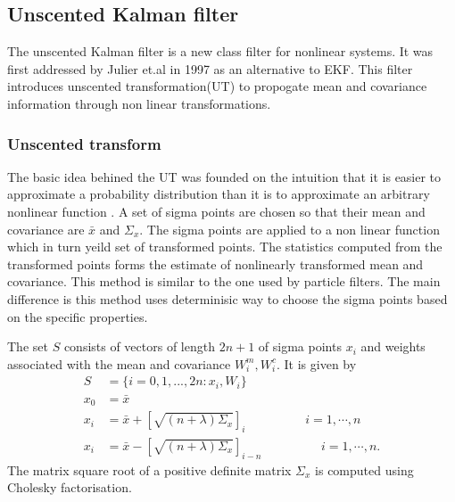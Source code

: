 \subsection{Unscented Kalman filter}
The unscented Kalman filter is a new class filter for nonlinear systems. It was first addressed by Julier et.al in 1997 \citep{jul97} as an alternative to EKF. This filter introduces unscented transformation(UT) to propogate mean and covariance information through non linear transformations.

\subsubsection{Unscented transform}
The basic idea behined the UT was founded on the intuition that it is easier to approximate a probability distribution than it is to approximate an arbitrary nonlinear function \citep{jul04}. A set of sigma points are chosen so that their mean and covariance are $\bar x$ and $\Sigma_x$. The sigma points are applied to a non linear function which in turn yeild set of transformed points. The statistics computed from the transformed points forms the estimate of nonlinearly transformed mean and covariance. This method is similar to the one used by particle filters. The main difference is this method uses determinisic way to choose the sigma points based on the specific properties. 

The set $S$ consists of vectors of length $2n+1$ of sigma points $x_i$ and weights associated with the mean and covariance $W_i^m, W_i^c $. It is given by \citep{sim07} 
\begin{equation} 
    \label{eq:ut_sigma}
    \begin{split}
    S &= \{i= 0,1,...,2n:x_i,W_i \} \\
    x_0 &= \bar x \\ 
    x_i &= \bar x + \left[ \sqrt{(n+\lambda)\Sigma_x} \right ]_i \hspace{2cm} i = 1, \cdots ,n \\
    x_i &= \bar x - \left[ \sqrt{(n+\lambda)\Sigma_x} \right ]_{i-n} \hspace{2cm} i = 1, \cdots ,n . 
    \end{split}
\end{equation}
The matrix square root of a positive definite matrix $\Sigma_x$ is computed using Cholesky factorisation. 

